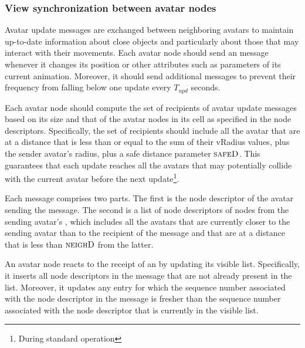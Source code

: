 


\subsubsection{View synchronization between avatar nodes}


\msgentry{\avupd}
\desc
Avatar update messages are exchanged between neighboring avatars to
maintain up-to-date information about close objects and particularly
about those that may interact with their movements. Each avatar node
should send an \avupd message whenever it changes its position or
other attributes such as parameters of its current
animation. Moreover, it should send additional \avupd messages to
prevent their frequency from falling below one update every $T_{upd}$
seconds.

Each avatar node should compute the set of recipients of avatar update
messages based on its size and that of the avatar nodes in its cell as
specified in the node descriptors. Specifically, the set of recipients
should include all the avatar that are at a distance that is less than
or equal to the sum of their vRadius values, plus the sender avatar's radius,
plus a safe distance parameter $\textsc{safeD}$. This guarantees that each
update reaches all the avatars that may potentially collide with the
current avatar before the next update\footnote{During standard
  operation}.

Each \avupd message comprises two parts. The first is the
node descriptor of the avatar sending the message. The second is a
list of node descriptors of nodes from the sending avatar's \vlist,
which includes all the avatars that are currently closer to the
sending avatar than to the recipient of the message and that are at a
distance that is less than $\textsc{neighD}$ from the latter. 

An avatar node reacts to the receipt of an \avupd by updating its
visible list. Specifically, it inserts all node descriptors in the
message that are not already present in the list. Moreover, it updates
any entry for which the sequence number associated with the node
descriptor in the \avupd message is fresher than the sequence number
associated with the node descriptor that is currently in the visible
list.


